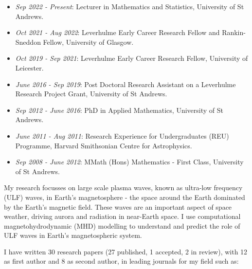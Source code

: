 \documentclass[11pt,a4paper]{article} %
\begin{document}
\begin{itemize}
	\item \textit{Sep 2022 - Present}: Lecturer in Mathematics and Statistics, University of St Andrews.
	\vspace{-0.25cm}
	\item \textit{Oct 2021 - Aug 2022}: Leverhulme Early Career Research Fellow and Rankin-Sneddon Fellow, University of Glasgow. 
	\vspace{-0.25cm}
	\item \textit{Oct 2019 - Sep 2021}: Leverhulme Early Career Research Fellow, University of Leicester.
	\vspace{-0.25cm}
	\item \textit{June 2016 - Sep 2019}: Post Doctoral Research Assistant on a Leverhulme Research Project Grant, University of St Andrews.
	\vspace{-0.25cm}
	\item \textit{Sep 2012 - June 2016}: PhD in Applied Mathematics, University of St Andrews. 
	\vspace{-0.25cm}
	\item \textit{June 2011 - Aug 2011}: Research Experience for Undergraduates (REU) Programme, Harvard Smithsonian Centre for Astrophysics.
	\vspace{-0.25cm}
	\item \textit{Sep 2008 - June 2012}: MMath (Hons) Mathematics - First Class, University of St Andrews.
\end{itemize}

\spacedhrule{0.5em}{-0.4em} %


My research focusses on large scale plasma waves, known as ultra-low frequency (ULF) waves, in Earth's magnetosphere - the space around the Earth dominated by the Earth's magnetic field. These waves are an important aspect of space weather, driving aurora and radiation in near-Earth space. I use computational magnetohydrodynamic (MHD) modelling to understand and predict the role of ULF waves in Earth's magnetospheric system.

\vspace{0.25cm}
\noindent I have written 30 research papers (27 published, 1 accepted, 2 in review), with 12 as first author and 8 as second author, in leading journals for my field such as:
\end{document}
